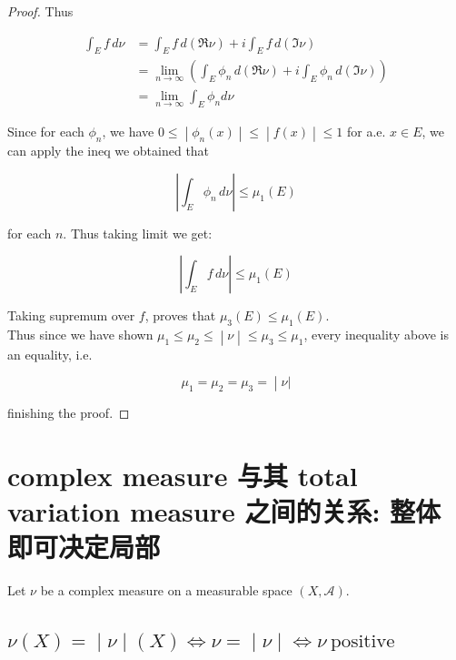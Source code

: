 \documentclass{qlnotes-export}
\begin{document}
\begin{proof}
Thus

\[\begin{matrix}
{\int_{E}f\, d\nu} & {= \int_{E}f\, d(\Re\nu) + i\int_{E}f\, d(\Im\nu)} \\
 & {= \lim\limits_{n\rightarrow\infty}(\int_{E}\phi_{n}\, d(\Re\nu) + i\int_{E}\phi_{n}\, d(\Im\nu))} \\
 & {= \lim\limits_{n\rightarrow\infty}\int_{E}\phi_{n}d\nu}
\end{matrix}\]

Since for each \(\phi_{n}\), we have \(\left. 0 \leq \middle| \phi_{n}(x) \middle| \leq \middle| f(x) \middle| \leq 1 \right.\) for a.e. \(x \in E\), we can apply the ineq we obtained that

\[\left| {\int_{E}\phi_{n}\, d\nu} \right| \leq \mu_{1}(E)\]

for each \(n\). Thus taking limit we get:

\[\left| {\int_{E}f\, d\nu} \right| \leq \mu_{1}(E)\]

Taking supremum over \(f\), proves that \(\mu_{3}(E) \leq \mu_{1}(E)\).\\
Thus since we have shown \(\left. \mu_{1} \leq \mu_{2} \leq \middle| \nu \middle| \leq \mu_{3} \leq \mu_{1} \right.\), every inequality above is an equality, i.e.

\[\left. \mu_{1} = \mu_{2} = \mu_{3} = \middle| \nu| \right.\]

finishing the proof.

\end{proof}

\section{complex measure 与其 total variation measure 之间的关系: 整体即可决定局部}\label{complex-measure-ux4e0eux5176-total-variation-measure-ux4e4bux95f4ux7684ux5173ux7cfb-ux6574ux4f53ux5373ux53efux51b3ux5b9aux5c40ux90e8}

Let \(\nu\) be a complex measure on a measurable space \((X,\mathcal{A})\).

\subsection{\texorpdfstring{\(\left. \nu(X) = \middle| \nu \middle| (X)\Leftrightarrow\nu = \middle| \nu \middle| \Leftrightarrow\nu\ \text{positive} \right.\)}{\textbackslash left. \textbackslash nu(X) = \textbackslash middle\textbar{} \textbackslash nu \textbackslash middle\textbar{} (X)\textbackslash Leftrightarrow\textbackslash nu = \textbackslash middle\textbar{} \textbackslash nu \textbackslash middle\textbar{} \textbackslash Leftrightarrow\textbackslash nu\textbackslash{} \textbackslash text\{positive\} \textbackslash right.}}\label{left.-nux-middle-nu-middle-xleftrightarrownu-middle-nu-middle-leftrightarrownu-textpositive-right.}
\end{document}
